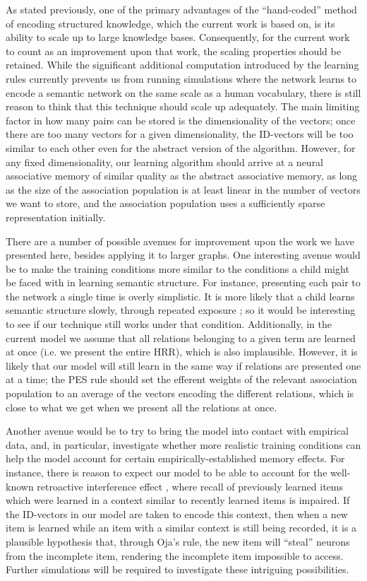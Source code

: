 \documentclass[10pt,letterpaper]{article}
\begin{document}
As stated previously, one of the primary advantages of the ``hand-coded'' method of encoding structured knowledge, which the current work is based on, is its ability to scale up to large knowledge bases. Consequently, for the current work to count as an improvement upon that work, the scaling properties should be retained. While the significant additional computation introduced by the learning rules currently prevents us from running simulations where the network learns to encode a semantic network on the same scale as a human vocabulary, there is still reason to think that this technique should scale up adequately. The main limiting factor in how many pairs can be stored is the dimensionality of the vectors; once there are too many vectors for a given dimensionality, the ID-vectors will be too similar to each other even for the abstract version of the algorithm. However, for any fixed dimensionality, our learning algorithm should arrive at a neural associative memory of similar quality as the abstract associative memory, as long as the size of the association population is at least linear in the number of vectors we want to store, and the association population uses a sufficiently sparse representation initially.

There are a number of possible avenues for improvement upon the work we have presented here, besides applying it to larger graphs. One interesting avenue would be to make the training conditions more similar to the conditions a child might be faced with in learning semantic structure. For instance, presenting each pair to the network a single time is overly simplistic. It is more likely that a child learns semantic structure slowly, through repeated exposure \citep{Deak}; so it would be interesting to see if our technique still works under that condition. Additionally, in the current model we assume that all relations belonging to a given term are learned at once (i.e. we present the entire HRR), which is also implausible. However, it is likely that our model will still learn in the same way if relations are presented one at a time; the PES rule should set the efferent weights of the relevant association population to an average of the vectors encoding the different relations, which is close to what we get when we present all the relations at once.

Another avenue would be to try to bring the model into contact with empirical data, and, in particular, investigate whether more realistic training conditions can help the model account for certain empirically-established memory effects. For instance, there is reason to expect our model to be able to account for the well-known retroactive interference effect \citep{Levy-Gigi}, where recall of previously learned items which were learned in a context similar to recently learned items is impaired. If the ID-vectors in our model are taken to encode this context, then when a new item is learned while an item with a similar context is still being recorded, it is a plausible hypothesis that, through Oja's rule, the new item will ``steal'' neurons from the incomplete item, rendering the incomplete item impossible to access. Further simulations will be required to investigate these intriguing possibilities.
\end{document}
